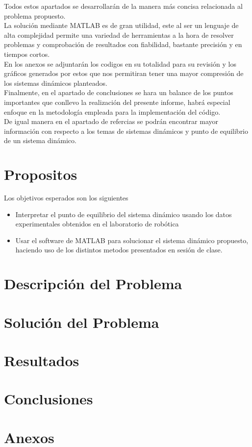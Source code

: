 \documentclass[12pt]{article}
\begin{document}
Todos estos apartados se desarrollarán de la manera más concisa relacionada al problema propuesto.\vspace{4mm} 
\\
La solución mediante MATLAB es de gran utilidad, este al ser un lenguaje de alta complejidad permite una variedad de herramientas a la hora de resolver problemas y comprobación de resultados con fiabilidad, bastante
precisión y en tiempos cortos. \vspace{4mm} 
\\
En los anexos se adjuntarán los codigos en su totalidad para su revisión y los gráficos generados por estos que nos permitiran tener una mayor compresión de los sistemas dinámicos planteados.\vspace{4mm}
\\
Finalmente, en el apartado de conclusiones se hara un balance de los puntos importantes que conllevo la realización del presente informe, habrá especial enfoque en la metodología empleada para la implementación del código.\vspace{4mm}
\\ 
De igual manera en el apartado de refercias se podrán encontrar mayor información con respecto a los temas de sistemas dinámicos y punto de equilibrio de un sistema dinámico.

\section{Propositos}
Los objetivos esperados son los siguientes
\begin{itemize}
    \item Interpretar  el punto de equilibrio del sistema dinámico usando los datos experimentales obtenidos en el laboratorio de robótica
    \item Usar el software de MATLAB para solucionar el sistema dinámico propuesto, haciendo uso de los distintos metodos presentados en sesión de clase.
\end{itemize}
\section{Descripción del Problema}

\section{Solución del Problema}

\section{Resultados}


\section{Conclusiones}

\section{Anexos}



\end{document}
